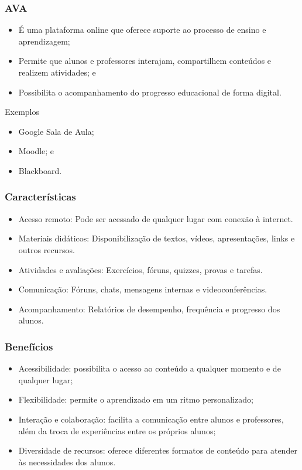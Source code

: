 \documentclass[aspectratio=169]{beamer} %
\begin{document}
\begin{frame}
	\frametitle{AVA}
	
	\begin{itemize}
		\item É uma plataforma online que oferece suporte ao processo de ensino e aprendizagem;
		\item Permite que alunos e professores interajam, compartilhem conteúdos e realizem atividades; e
		\item Possibilita o acompanhamento do progresso educacional de forma digital.
	\end{itemize} \vfill
	
	\begin{exampleblock}{Exemplos}
		\begin{itemize}
			\item Google Sala de Aula;
			\item Moodle; e
			\item Blackboard.
		\end{itemize}
	\end{exampleblock}
\end{frame}

\begin{frame}
	\frametitle{Características}
	
	\begin{itemize}
		\item Acesso remoto: Pode ser acessado de qualquer lugar com conexão à internet.
		\item Materiais didáticos: Disponibilização de textos, vídeos, apresentações, links e outros recursos.
		\item Atividades e avaliações: Exercícios, fóruns, quizzes, provas e tarefas.
		\item Comunicação: Fóruns, chats, mensagens internas e videoconferências.
		\item Acompanhamento: Relatórios de desempenho, frequência e progresso dos alunos.
	\end{itemize}
\end{frame}

\begin{frame}
	\frametitle{Benefícios}
	
	\begin{itemize}
		\item Acessibilidade: possibilita o acesso ao conteúdo a qualquer momento e de qualquer lugar;
		\item Flexibilidade: permite o aprendizado em um ritmo personalizado;
		\item Interação e colaboração: facilita a comunicação entre alunos e professores, além da troca de experiências entre os próprios alunos;
		\item Diversidade de recursos: oferece diferentes formatos de conteúdo para atender às necessidades dos alunos.
	\end{itemize}
\end{frame}
\end{document}
